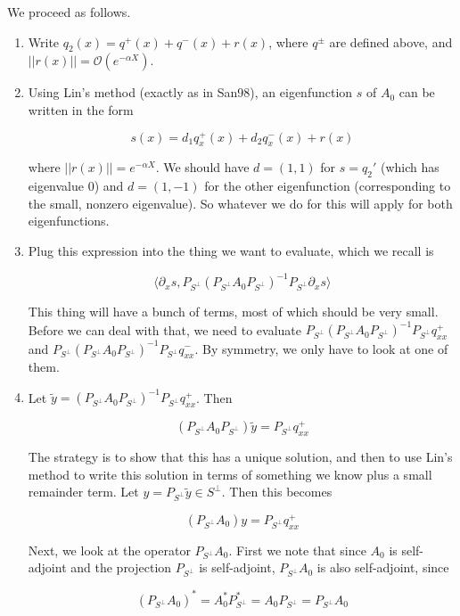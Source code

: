 \documentclass[12pt]{article}
\begin{document}
We proceed as follows.

\begin{enumerate}

\item Write $q_2(x) = q^+(x) + q^-(x) + r(x)$, where $q^\pm$ are defined above, and $||r(x)|| = \mathcal{O}(e^{-\alpha X})$.

\item Using Lin's method (exactly as in San98), an eigenfunction $s$ of $A_0$ can be written in the form

\[
s(x) = d_1 q^+_x(x) + d_2 q^-_x(x) + r(x)
\]

where $||r(x)|| = e^{-\alpha X}$. We should have $d = (1, 1)$ for $s = q_2'$ (which has eigenvalue 0) and $d = (1, -1)$ for the other eigenfunction (corresponding to the small, nonzero eigenvalue). So whatever we do for this will apply for both eigenfunctions.

\item Plug this expression into the thing we want to evaluate, which we recall is

\[
\langle \partial_x s, P_{S^\perp} (P_{S^\perp} A_0 P_{S^\perp})^{-1} P_{S^\perp} \partial_x s \rangle
\]

This thing will have a bunch of terms, most of which should be very small. Before we can deal with that, we need to evaluate $P_{S^\perp} (P_{S^\perp} A_0 P_{S^\perp})^{-1} P_{S^\perp} q^+_{xx}$ and $P_{S^\perp} (P_{S^\perp} A_0 P_{S^\perp})^{-1} P_{S^\perp} q^-_{xx}$. By symmetry, we only have to look at one of them.

\item Let $\tilde{y} = (P_{S^\perp} A_0 P_{S^\perp})^{-1} P_{S^\perp} q^+_{xx}$. Then 

\[
(P_{S^\perp} A_0 P_{S^\perp}) \tilde{y} = P_{S^\perp} q^+_{xx}
\]

The strategy is to show that this has a unique solution, and then to use Lin's method to write this solution in terms of something we know plus a small remainder term. Let $y = P_{S^\perp} \tilde{y} \in S^\perp$. Then this becomes

\[
(P_{S^\perp} A_0) y = P_{S^\perp} q^+_{xx}
\]

Next, we look at the operator $P_{S^\perp} A_0$. First we note that since $A_0$ is self-adjoint and the projection $P_{S^\perp}$ is self-adjoint, $P_{S^\perp} A_0$ is also self-adjoint, since

\[
(P_{S^\perp} A_0)^* = A_0^* P_{S^\perp}^* = A_0 P_{S^\perp} = P_{S^\perp} A_0
\]


\end{enumerate}
\end{document}
